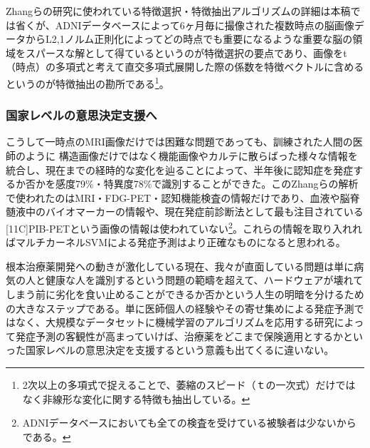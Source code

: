Zhangらの研究に使われている特徴選択・特徴抽出アルゴリズムの詳細は本稿では省くが、ADNIデータベースによって6ヶ月毎に撮像された複数時点の脳画像データからL2,1ノルム正則化によってどの時点でも重要になるような重要な脳の領域をスパースな解として得ているというのが特徴選択の要点であり、画像をt（時点）の多項式と考えて直交多項式展開した際の係数を特徴ベクトルに含めるというのが特徴抽出の勘所である\footnote{2次以上の多項式で捉えることで、萎縮のスピード（ｔの一次式）だけではなく非線形な変化に関する特徴も抽出している。}。

\subsubsection{国家レベルの意思決定支援へ}
こうして一時点のMRI画像だけでは困難な問題であっても、訓練された人間の医師のように
構造画像だけではなく機能画像やカルテに散らばった様々な情報を統合し、現在までの経時的な変化を辿ることによって、半年後に認知症を発症するか否かを感度79\%・特異度78\%で識別することができた。このZhangらの解析で使われたのはMRI・FDG-PET・認知機能検査の情報だけであり、血液や脳脊髄液中のバイオマーカーの情報や、現在発症前診断法として最も注目されている[11C]PIB-PETという画像の情報は使われていない\footnote{ADNIデータベースにおいても全ての検査を受けている被験者は少ないからである。}。これらの情報を取り入れればマルチカーネルSVMによる発症予測はより正確なものになると思われる。

根本治療薬開発への動きが激化している現在、我々が直面している問題は単に病気の人と健康な人を識別するという問題の範疇を超えて、ハードウェアが壊れてしまう前に劣化を食い止めることができるか否かという人生の明暗を分けるための大きなステップである。単に医師個人の経験やその寄せ集めによる発症予測ではなく、大規模なデータセットに機械学習のアルゴリズムを応用する研究によって発症予測の客観性が高まっていけば、治療薬をどこまで保険適用とするかといった国家レベルの意思決定を支援するという意義も出てくるに違いない。

%
%
%
%

